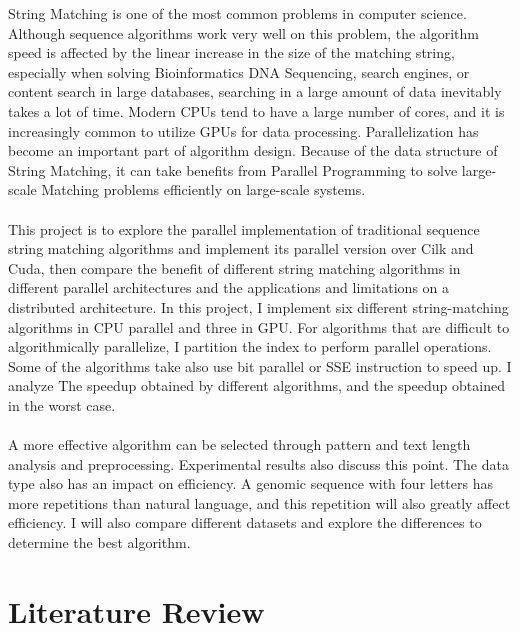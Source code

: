 \documentclass[11pt]{article}       %
\begin{document}
String Matching is one of the most common problems in computer science. Although sequence algorithms work very well on this problem, the algorithm speed is affected by the linear increase in the size of the matching string, especially when solving Bioinformatics DNA Sequencing, search engines, or content search in large databases, searching in a large amount of data inevitably takes a lot of time. Modern CPUs tend to have a large number of cores, and it is increasingly common to utilize GPUs for data processing. Parallelization has become an important part of algorithm design. Because of the data structure of String Matching, it can take benefits from Parallel Programming to solve large-scale Matching problems efficiently on large-scale systems.\\
\\This project is to explore the parallel implementation of traditional sequence string matching algorithms and implement its parallel version over Cilk and Cuda, then compare the benefit of different string matching algorithms in different parallel architectures and the applications and limitations on a distributed architecture. In this project, I implement six different string-matching algorithms in CPU parallel and three in GPU. For algorithms that are difficult to algorithmically parallelize, I partition the index to perform parallel operations. Some of the algorithms take also use bit parallel or SSE instruction to speed up. I analyze The speedup obtained by different algorithms, and the speedup obtained in the worst case.\\ 
\\A more effective algorithm can be selected through pattern and text length analysis and preprocessing. Experimental results also discuss this point. The data type also has an impact on efficiency. A genomic sequence with four letters has more repetitions than natural language, and this repetition will also greatly affect efficiency. I will also compare different datasets and explore the differences to determine the best algorithm.\\




\section{Literature Review} \label{litrev}
\end{document}
